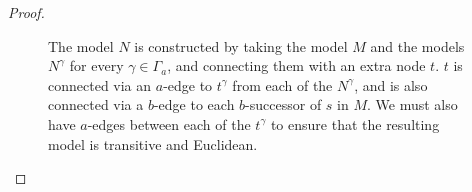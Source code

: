 \begin{proof}
\begin{figure}
\begin{center} %
\caption{
The model $N$ is constructed by taking the model $M$ and the models $N^\gamma$
for every $\gamma \in \Gamma_a$, and connecting them with an extra node $t$. $t$
is connected via an $a$-edge to $t^\gamma$ from each of the $N^\gamma$, and is
also connected via a $b$-edge to each $b$-successor of $s$ in $M$. We must also
have $a$-edges between each of the $t^\gamma$ to ensure that the resulting model
is transitive and Euclidean.
}
\end{center}
\end{figure}


\end{proof}
